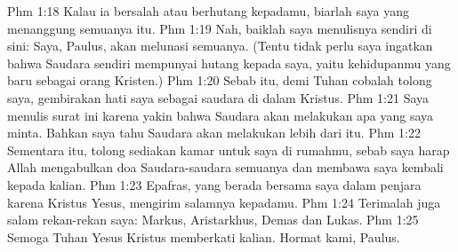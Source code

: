 Phm 1:18  Kalau ia bersalah atau berhutang kepadamu, biarlah saya yang menanggung semuanya itu.
Phm 1:19  Nah, baiklah saya menulisnya sendiri di sini: Saya, Paulus, akan melunasi semuanya. (Tentu tidak perlu saya ingatkan bahwa Saudara sendiri mempunyai hutang kepada saya, yaitu kehidupanmu yang baru sebagai orang Kristen.)
Phm 1:20  Sebab itu, demi Tuhan cobalah tolong saya, gembirakan hati saya sebagai saudara di dalam Kristus.
Phm 1:21  Saya menulis surat ini karena yakin bahwa Saudara akan melakukan apa yang saya minta. Bahkan saya tahu Saudara akan melakukan lebih dari itu.
Phm 1:22  Sementara itu, tolong sediakan kamar untuk saya di rumahmu, sebab saya harap Allah mengabulkan doa Saudara-saudara semuanya dan membawa saya kembali kepada kalian.
Phm 1:23  Epafras, yang berada bersama saya dalam penjara karena Kristus Yesus, mengirim salamnya kepadamu.
Phm 1:24  Terimalah juga salam rekan-rekan saya: Markus, Aristarkhus, Demas dan Lukas.
Phm 1:25  Semoga Tuhan Yesus Kristus memberkati kalian. Hormat kami, Paulus.


